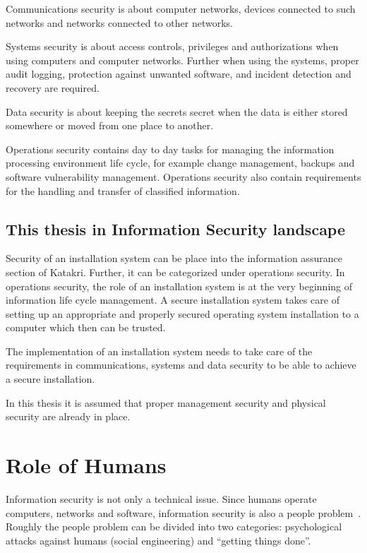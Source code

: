Communications security is about computer networks, devices connected
to such networks and networks connected to other networks.

Systems security is about access controls, privileges and
authorizations when using computers and computer networks. Further
when using the systems, proper audit logging, protection against
unwanted software, and incident detection and recovery are required.

Data security is about keeping the secrets secret when the data is
either stored somewhere or moved from one place to another.

Operations security contains day to day tasks for managing the
information processing environment life cycle, for example change
management, backups and software vulnerability management. Operations
security also contain requirements for the handling and transfer of
classified information.


\subsection{This thesis in Information Security landscape}

Security of an installation system can be place into the information
assurance section of Katakri. Further, it can be categorized under
operations security. In operations security, the role of an
installation system is at the very beginning of information life cycle
management. A secure installation system takes care of setting up
an appropriate and properly secured operating system installation to
a computer which then can be trusted.

The implementation of an installation system needs to take care of the
requirements in communications, systems and data security to be able
to achieve a secure installation.

In this thesis it is assumed that proper management security and
physical security are already in place.


\section{Role of Humans}

Information security is not only a technical issue. Since humans
operate computers, networks and software, information security is also
a people problem~\cite{parsons2010human}\cite{anderson}. Roughly the
people problem can be divided into two categories: psychological
attacks against humans (social engineering) and ``getting things
done''.

